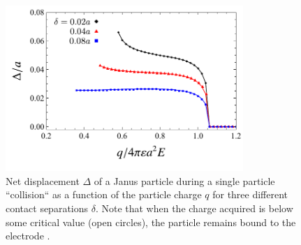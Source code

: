 \begin{appendices}
\begin{figure}[h]
    \centering
    \includegraphics[width=9cm]{figures/A1_Displacement.pdf}
    \caption{Net displacement $\Delta$ of a Janus particle during a single particle ``collision`` as a function of the particle charge $q$ for three different contact separations $\delta$. Note that when the charge acquired is below some critical value (open circles), the particle remains bound to the electrode \cite{drews2015contact}.}
    \label{fig:Displacement}
\end{figure}








\end{appendices}